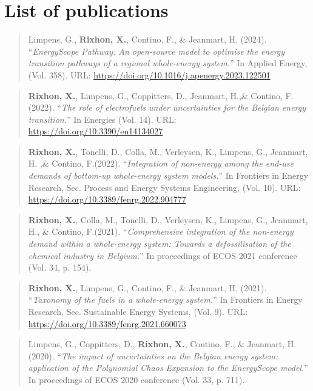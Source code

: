

\chapter{List of publications}
\vskip0.5cm


\begin{quote}
Limpens, G., \textbf{Rixhon, X.}, Contino, F., \& Jeanmart, H. (2024). ``\emph{EnergyScope Pathway: An open-source model to optimise the energy transition pathways of a regional whole-energy system.}'' In Applied Energy, (Vol. 358). URL: \url{https://doi.org/10.1016/j.apenergy.2023.122501}
\end{quote}

\begin{quote}
\textbf{Rixhon, X.}, Limpens, G., Coppitters, D., Jeanmart, H.,\& Contino, F.(2022). ``\emph{The role of electrofuels under uncertainties for the Belgian energy transition.}'' In Energies (Vol. 14). URL: \url{https://doi.org/10.3390/en14134027}
\end{quote}

\begin{quote}
\textbf{Rixhon, X.}, Tonelli, D., Colla, M., Verleysen, K., Limpens, G., Jeanmart, H. ,\& Contino, F.(2022). ``\emph{Integration of non-energy among the end-use demands of bottom-up whole-energy system models.}'' In Frontiers in Energy Research, Sec. Process and Energy Systems Engineering, (Vol. 10). URL: \url{https://doi.org/10.3389/fenrg.2022.904777}
\end{quote}

\begin{quote}
\textbf{Rixhon, X.}, Colla, M., Tonelli, D., Verleysen, K.,  Limpens, G., Jeanmart, H., \& Contino, F.(2021). ``\emph{Comprehensive integration of the non-energy demand within a whole-energy system: Towards a defossilisation of the chemical industry in Belgium.}'' In proceedings of  ECOS 2021 conference (Vol. 34, p. 154).
\end{quote}

\begin{quote}
\textbf{Rixhon, X.}, Limpens, G., Contino, F., \& Jeanmart, H. (2021). ``\emph{Taxonomy of the fuels in a whole-energy system.}'' In Frontiers in Energy Research, Sec. Sustainable Energy Systems, (Vol. 9). URL: \url{https://doi.org/10.3389/fenrg.2021.660073} 
\end{quote}

\begin{quote}
Limpens, G., Coppitters, D., \textbf{Rixhon, X.}, Contino, F., \& Jeanmart, H. (2020). ``\emph{The impact of uncertainties on the Belgian energy system: application of the Polynomial Chaos Expansion to the EnergyScope model.}'' In proceedings of  ECOS 2020 conference (Vol. 33, p. 711).
\end{quote}